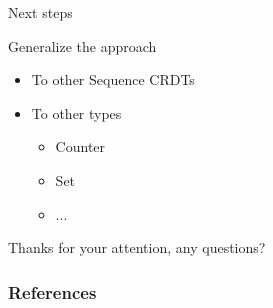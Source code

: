 \documentclass[10pt]{beamer}
\begin{document}
\begin{frame}{Next steps}

  \begin{block}{Generalize the approach}
    \begin{itemize}
      \item To other Sequence \acp{CRDT}
      \item To other types
      \begin{itemize}
        \item Counter
        \item Set
        \item ...
      \end{itemize}
    \end{itemize}
  \end{block}
\end{frame}

\begin{frame}[standout]
  Thanks for your attention, any questions?
  \vspace{3em}
  \begin{center}
    \ccby
  \end{center}
\end{frame}

\begin{frame}[allowframebreaks]
  \frametitle{References}
  
  
\end{frame}

\end{document}
